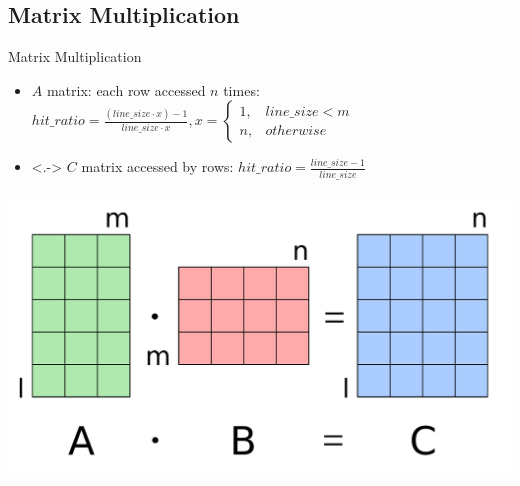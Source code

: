 \documentclass[handout,aspectratio=169]{beamer}
\begin{document}
\subsection{Matrix Multiplication}
\begin{frame}{Matrix Multiplication}
	\begin{minipage}{.77\textwidth}
		\begin{itemize}
			\item $A$ matrix: each row accessed $n$ times:
				$hit\_ratio = \frac{(line\_size \cdot x) - 1}{line\_size \cdot x},
				x = \begin{cases}
					1, & line\_size < m \\
					n, & otherwise
				\end{cases}$
			\item<.-> $C$ matrix
				accessed by rows:
				$hit\_ratio = \frac{line\_size - 1}{line\_size}$
		\end{itemize}
	\end{minipage}
	\begin{minipage}{.22\textwidth}
		\begin{center}
			\includegraphics[width=.9\textwidth]{matmul.png}
		\end{center}
	\end{minipage}
\end{frame}
\end{document}

